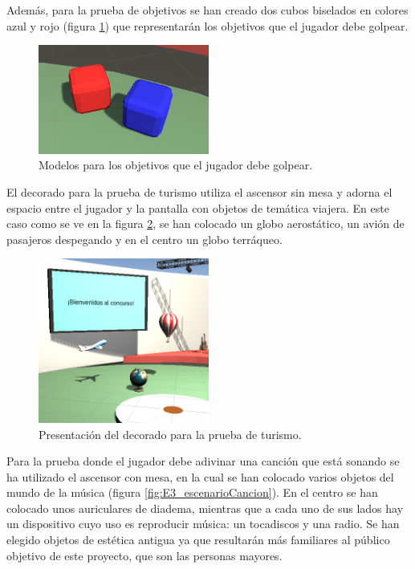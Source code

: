 Además, para la prueba de objetivos se han creado dos cubos biselados en colores azul y rojo (figura \ref{fig:E3_modelosObjetivos}) que representarán los objetivos que el jugador debe golpear.

\begin{figure}
  \centering
    \includegraphics[width=0.5\textwidth]{04.Desarrollo/03.Entrega3/02.Iteracion3_2/00.Figuras/08.unity_5.png}
    \caption{Modelos para los objetivos que el jugador debe golpear.}
    \label{fig:E3_modelosObjetivos}
\end{figure}

El decorado para la prueba de turismo utiliza el ascensor sin mesa y adorna el espacio entre el jugador y la pantalla con objetos de temática viajera. En este caso como se ve en la figura \ref{fig:E3_escenarioTurismo}, se han colocado un globo aerostático, un avión de pasajeros despegando y en el centro un globo terráqueo.


\begin{figure}
  \centering
    \includegraphics[width=0.5\textwidth]{04.Desarrollo/03.Entrega3/02.Iteracion3_2/00.Figuras/09.unity_2.png}
    \caption{Presentación del decorado para la prueba de turismo.}
    \label{fig:E3_escenarioTurismo}
\end{figure}


Para la prueba donde el jugador debe adivinar una canción que está sonando se ha utilizado el ascensor con mesa, en la cual se han colocado varios objetos del mundo de la música (figura \ref{fig:E3_escenarioCancion}). En el centro se han colocado unos auriculares de diadema, mientras que a cada uno de sus lados hay un dispositivo cuyo uso es reproducir música: un tocadiscos y una radio. Se han elegido objetos de estética antigua ya que resultarán más familiares al público objetivo de este proyecto, que son las personas mayores.

